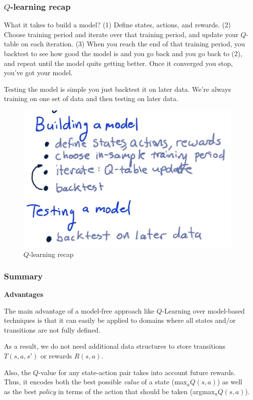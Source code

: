 \documentclass[12pt]{article}
\begin{document}
\subsubsection{$Q$-learning recap}

What it takes to build a model? (1) Define states, actions, and rewards. (2) Choose training period and iterate over that training period, and update your $Q$-table on each iteration. (3) When you reach the end of that training period, you backtest to see how good the model is and you go back and you go back to (2), and repeat until the model quits getting better. Once it converged you stop, you've got your model. 

Testing the model is simple you just backtest it on later data. We're always training on one set of data and then testing on later data. 

\begin{figure}[!ht]
\centering
\includegraphics[scale=0.45]{fig/fig113}
\caption{$Q$-learning recap}
\end{figure}

\subsubsection{Summary}

\textbf{Advantages}

\begin{description}[font=$\bullet$\scshape\bfseries]
\item The main advantage of a model-free approach like $Q$-Learning over model-based techniques is that it can easily be applied to domains where all states and/or transitions are not fully defined. \\[-35pt]
\item As a result, we do not need additional data structures to store transitions $T(s, a, s')$ or rewards $R(s, a)$. \\[-35pt]
\item Also, the $Q$-value for any state-action pair takes into account future rewards. Thus, it encodes both the best possible \textit{value} of a state (max$_a Q(s, a)$) as well as the best \textit{policy} in terms of the action that should be taken (argmax$_a Q(s, a)$).
\end{description}
\end{document}
